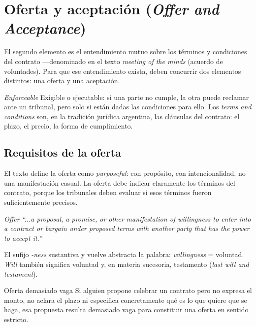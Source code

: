 \documentclass[12pt,oneside]{book}
\begin{document}
\section{Oferta y aceptación (\textit{Offer and Acceptance})}

El segundo elemento es el entendimiento mutuo sobre los términos y condiciones del contrato ---denominado en el texto \textit{meeting of the minds} (acuerdo de voluntades). Para que ese entendimiento exista, deben concurrir dos elementos distintos: una oferta y una aceptación.

\begin{definition}{\textit{Enforceable}}
Exigible o ejecutable: si una parte no cumple, la otra puede reclamar ante un tribunal, pero solo si están dadas las condiciones para ello. Los \textit{terms and conditions} son, en la tradición jurídica argentina, las cláusulas del contrato: el plazo, el precio, la forma de cumplimiento.
\end{definition}

\subsection{Requisitos de la oferta}

El texto define la oferta como \textit{purposeful}: con propósito, con intencionalidad, no una manifestación casual. La oferta debe indicar claramente los términos del contrato, porque los tribunales deben evaluar si esos términos fueron suficientemente precisos.

\begin{definition}{\textit{Offer}}
\textit{``...a proposal, a promise, or other manifestation of willingness to enter into a contract or bargain under proposed terms with another party that has the power to accept it.''}

El sufijo \textit{-ness} sustantiva y vuelve abstracta la palabra: \textit{willingness} = voluntad. \textit{Will} también significa voluntad y, en materia sucesoria, testamento (\textit{last will and testament}).
\end{definition}

\begin{example}{Oferta demasiado vaga}
Si alguien propone celebrar un contrato pero no expresa el monto, no aclara el plazo ni especifica concretamente qué es lo que quiere que se haga, esa propuesta resulta demasiado vaga para constituir una oferta en sentido estricto.
\end{example}
\end{document}
